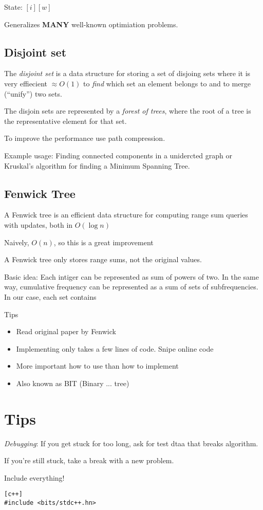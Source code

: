 \documentclass{article}
\begin{document}
State: $[i][w]$

Generalizes \textbf{MANY} well-known optimiation problems.

\subsection{Disjoint set}
The \emph{disjoint set} is a data structure for storing a set of disjoing sets
where it is very effiecient $\approx O(1)$ to \emph{find} which set an element
belongs to and to merge (``unify'') two sets.

The disjoin sets are represented by a \emph{forest of trees}, where the root of a tree
is the representative element for that set.

To improve the performance use path compression.

Example usage: Finding connected components in a unidercted graph or Kruskal's
algorithm for finding a Minimum Spanning Tree.

\subsection{Fenwick Tree}
A Fenwick tree is an efficient data structure for computing range sum queries
with updates, both in $O(\log n)$

Naively, $O(n)$, so this is a great improvement

A Fenwick tree only stores range sums, not the original values.

Basic idea: Each intiger can be represented as sum of powers of two. In the same
way, cumulative frequency can be represented as a sum of sets of subfrequencies.
In our case, each set contains 

Tips
\begin{itemize}
    \item Read original paper by Fenwick
    \item Implementing only takes a few lines of code. Snipe online code
    \item More important how to use than how to implement
    \item Also known as BIT (Binary ... tree)
\end{itemize}

\section{Tips}
\emph{Debugging}: If you get stuck for too long, ask for test dtaa that breaks
algorithm.

If you're still stuck, take a break with a new problem.

Include everything!
\begin{lstlisting}[c++]
#include <bits/stdc++.hn>
\end{lstlisting}
\end{document}
